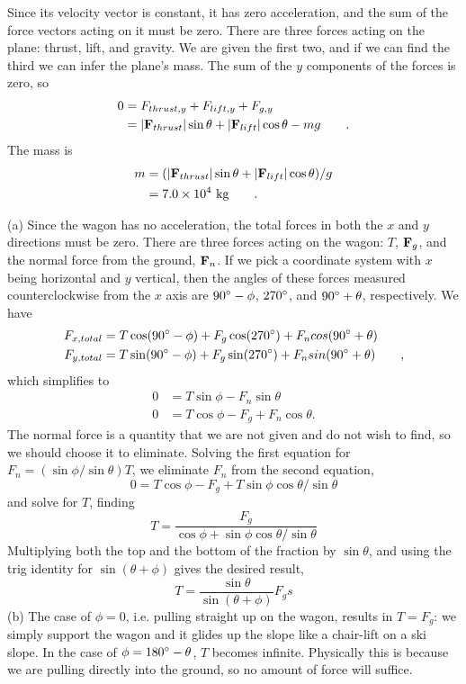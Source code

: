 Since its velocity vector is constant, it has zero
acceleration, and the sum of the force vectors acting on it
must be zero. There are three forces acting on the plane:
thrust, lift, and gravity. We are given the first two, and
if we can find the third we can infer the plane's mass. The sum of
the $y$ components of the forces is zero, so
\begin{align*}
	0	&= F_{thrust,y} +F_{lift,y} +F_{g,y} \\
		&= |\textbf{F}_{thrust}| \sin \theta + |\textbf{F}_{lift}| \cos \theta - mg \qquad   .
\end{align*}
The mass is
\begin{align*}
	m	&= (|\textbf{F}_{thrust}| \sin \theta + |\textbf{F}_{lift}| \cos \theta) / g \\
		&= 7.0\times10^4\ \textup{kg} \qquad .
\end{align*}

(a) Since the wagon has no acceleration, the total
forces in both the $x$ and $y$ directions must be zero. There
are three forces acting on the wagon: $T$, $\textbf{F}_g$, and the normal
force from the ground, $\textbf{F}_n$. If we pick a coordinate system
with $x$ being horizontal and $y$ vertical, then the angles of
these forces measured counterclockwise from the $x$ axis are
$90\mspace{0mu}^\circ-\phi$, $270\mspace{0mu}^\circ$, and $90\mspace{0mu}^\circ+\theta$, respectively.
We have
\begin{align*}
	F_{x,total} &= T\cos(90\mspace{0mu}^\circ-\phi) + F_{g}\cos(270\mspace{0mu}^\circ) +
				F_ncos(90\mspace{0mu}^\circ+\theta) \\
	F_{y,total} &= T\sin(90\mspace{0mu}^\circ-\phi) + F_{g}\sin(270\mspace{0mu}^\circ) +
				F_nsin(90\mspace{0mu}^\circ+\theta)   \qquad ,
\end{align*}
which simplifies to
\begin{align*}
	0 &= T \sin \phi - F_n \sin \theta\\
	0 &= T \cos \phi  - F_{g} + F_n \cos \theta  .
\end{align*}
The normal force is a quantity that we are not given and do
not wish to find, so we should choose it to eliminate.
Solving the first equation for $F_n=(\sin \phi/\sin \theta)T$, we
eliminate $F_n$ from the second equation,
\begin{equation*}
	0 = T \cos \phi  - F_{g} + T \sin \phi \cos \theta/\sin \theta
\end{equation*}
and solve for $T$, finding
\begin{equation*}
	T = \frac{F_g}{\cos\phi+\sin\phi\cos\theta/\sin\theta}
\end{equation*}
Multiplying both the top and the bottom of the fraction by
$\sin \theta$, and using the trig identity for $\sin(\theta+\phi)$ gives the
desired result,
\begin{equation*}
	T = \frac{\sin\theta}{\sin(\theta+\phi)}F_gs
\end{equation*}
(b) The case of $\phi=0$, i.e. pulling straight up on the wagon,
results in $T=F_{g}$: we simply support the wagon and it glides
up the slope like a chair-lift on a ski slope. In the case
of $\phi=180\mspace{0mu}^\circ-\theta$, $T$ becomes infinite. Physically this is
because we are pulling directly into the ground, so no
amount of force will suffice.

